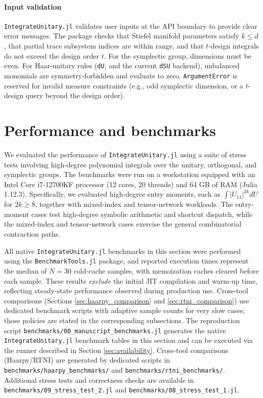 \documentclass[manuscript,screen]{acmart}
\begin{document}
\paragraph{Input validation}
\texttt{IntegrateUnitary.jl} validates user inputs at the API boundary to provide clear
error messages. The package checks that Stiefel manifold parameters satisfy
$k \le d$, that partial trace subsystem indices are within range, and that
$t$-design integrals do not exceed the design order $t$. For the symplectic
group, dimensions must be even. For Haar-unitary rules (\texttt{dU}, and the
current \texttt{dSU} backend), unbalanced monomials are symmetry-forbidden and
evaluate to zero. \texttt{ArgumentError} is reserved for invalid measure
constraints (e.g., odd symplectic dimension, or a $t$-design query beyond the
design order).

\section{Performance and benchmarks}
\label{sec:performance}
We evaluated the performance of \texttt{IntegrateUnitary.jl} using a suite of stress tests
involving high-degree polynomial integrals over the unitary, orthogonal, and
symplectic groups. The benchmarks were run on a workstation equipped with an
Intel Core i7-12700KF processor (12 cores, 20 threads) and 64 GB of RAM (Julia
1.12.3). Specifically, we evaluated high-degree entry moments, such as
$\int |U_{11}|^{2k} dU$ for $2k \geq 8$, together with mixed-index and
tensor-network workloads. The entry-moment cases test high-degree symbolic
arithmetic and shortcut dispatch, while the mixed-index and tensor-network
cases exercise the general combinatorial contraction paths.

All native \texttt{IntegrateUnitary.jl} benchmarks in this section were performed using the
\texttt{BenchmarkTools.jl} package, and reported execution times represent the
median of $N=30$ cold-cache samples, with memoization caches cleared before
each sample. These results \emph{exclude} the initial JIT compilation and
warm-up time, reflecting steady-state performance observed during production
use. Cross-tool comparisons (Sections
\ref{sec:haarpy_comparison} and \ref{sec:rtni_comparison}) use dedicated
benchmark scripts with adaptive sample counts for very slow cases; those
policies are stated in the corresponding subsections. The reproduction script
\texttt{benchmarks/00\_manuscript\_benchmarks.jl} generates the native
\texttt{IntegrateUnitary.jl} benchmark tables in this section and can be executed via the
runner described in Section \ref{sec:availability}. Cross-tool comparisons
(Haarpy/RTNI) are generated by dedicated scripts in
\texttt{benchmarks/haarpy\_benchmarks/} and
\texttt{benchmarks/rtni\_benchmarks/}. Additional stress tests and correctness
checks are available in \texttt{benchmarks/09\_stress\_test\_2.jl} and
\texttt{benchmarks/08\_stress\_test\_1.jl}.
\end{document}
